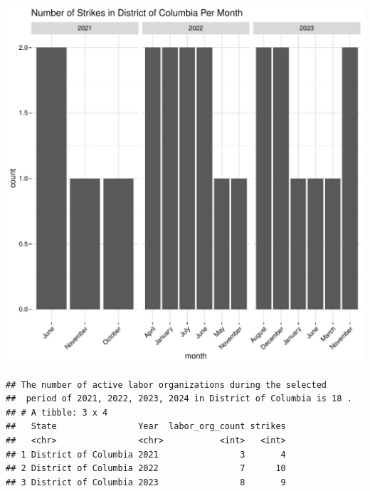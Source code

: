 \documentclass[11pt]{article}\usepackage[]{graphicx}\usepackage[]{xcolor}
\makeatletter
\newenvironment{kframe}{%
 \def\at@end@of@kframe{}%
 \ifinner\ifhmode%
  \def\at@end@of@kframe{\end{minipage}}%
  \begin{minipage}{\columnwidth}%
 \fi\fi%
 \def\FrameCommand##1{\hskip\@totalleftmargin \hskip-\fboxsep
 \colorbox{shadecolor}{##1}\hskip-\fboxsep
     \hskip-\linewidth \hskip-\@totalleftmargin \hskip\columnwidth}%
 \MakeFramed {\advance\hsize-\width
   \@totalleftmargin\z@ \linewidth\hsize
   \@setminipage}}%
 {\par\unskip\endMakeFramed%
 \at@end@of@kframe}
\newenvironment{knitrout}{}{} %
\makeatother
\begin{document}
\begin{knitrout}
\color{fgcolor}

{\centering \includegraphics[width=0.7\linewidth]{figure/calling_the_ggplots_for_DC-1} 

}


\begin{kframe}\begin{verbatim}
## The number of active labor organizations during the selected 
##  period of 2021, 2022, 2023, 2024 in District of Columbia is 18 .
## # A tibble: 3 x 4
##   State                Year  labor_org_count strikes
##   <chr>                <chr>           <int>   <int>
## 1 District of Columbia 2021                3       4
## 2 District of Columbia 2022                7      10
## 3 District of Columbia 2023                8       9
\end{verbatim}
\end{kframe}
\end{knitrout}
\end{document}
